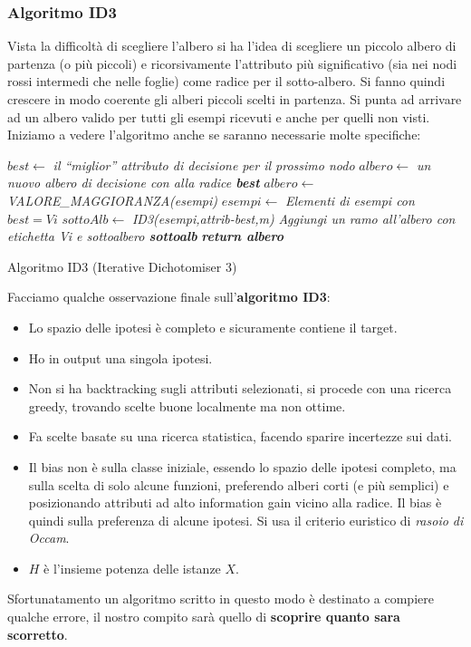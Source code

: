 \subsubsection{Algoritmo ID3}
Vista la difficoltà di scegliere l'albero si ha l'idea di scegliere un piccolo
albero di partenza (o più piccoli) e ricorsivamente l'attributo più
significativo (sia nei nodi rossi intermedi che nelle foglie) come radice per il
sotto-albero. Si fanno quindi crescere in modo 
coerente gli alberi piccoli scelti in partenza. Si punta ad arrivare ad un
albero valido per tutti gli esempi ricevuti e anche per quelli non visti.\\
Iniziamo a vedere l'algoritmo anche se saranno necessarie molte specifiche:
\begin{algorithm}[H]
  \begin{algorithmic}
    \EndIf
    \EndIf
    \EndIf
    \State $best \gets$ \textit{il ``miglior'' attributo di decisione per il
    prossimo nodo}
    \State $albero \gets$ \textit{un nuovo albero di decisione con alla radice \textbf{best}}
    \State $albero \gets$ \textit{VALORE\_MAGGIORANZA(esempi)}
    \State $esempi \gets$ \textit{Elementi di esempi con $best = Vi$}
    \State $sottoAlb \gets$ \textit{ID3(esempi,attrib-best,m)}
    \State \textit{Aggiungi un ramo all'albero con etichetta Vi e sottoalbero \textbf{sottoalb}}
    \EndFor
    \State \textit{\textbf{return albero}}
    \EndFunction
  \end{algorithmic}
  \caption{Algoritmo ID3 (Iterative Dichotomiser 3)}
\end{algorithm}
Facciamo qualche osservazione finale sull'\textbf{algoritmo ID3}:
\begin{itemize}
  \item Lo spazio delle ipotesi è completo e sicuramente contiene il target.
  \item Ho in output una singola ipotesi.
  \item Non si ha backtracking sugli attributi selezionati, si procede con una
  ricerca greedy, trovando scelte buone localmente ma non ottime.
  \item Fa scelte basate su una ricerca statistica, facendo sparire incertezze
  sui dati.
  \item Il bias non è sulla classe iniziale, essendo lo spazio delle ipotesi
  completo, ma sulla scelta di solo alcune funzioni, preferendo alberi corti (e
  più semplici) e posizionando attributi ad alto information gain vicino alla
  radice. Il bias è quindi sulla preferenza di alcune ipotesi. Si usa il
  criterio euristico di \textit{rasoio di Occam}.
  \item $H$ è l'insieme potenza delle istanze $X$.
\end{itemize}
Sfortunatamento un algoritmo scritto in questo modo è destinato a compiere qualche errore, il nostro compito sarà quello di \textbf{scoprire quanto sara scorretto}.
